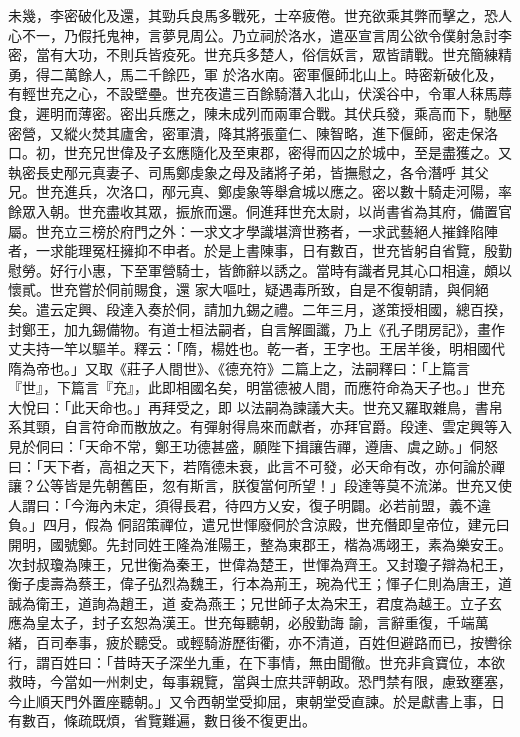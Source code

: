 \begin{pinyinscope}
 未幾，李密破化及還，其勁兵良馬多戰死，士卒疲倦。世充欲乘其弊而擊之，恐人心不一，乃假托鬼神，言夢見周公。乃立祠於洛水，遣巫宣言周公欲令僕射急討李密，當有大功，不則兵皆疫死。世充兵多楚人，俗信妖言，眾皆請戰。世充簡練精勇，得二萬餘人，馬二千餘匹，軍
 於洛水南。密軍偃師北山上。時密新破化及，有輕世充之心，不設壁壘。世充夜遣三百餘騎潛入北山，伏溪谷中，令軍人秣馬蓐食，遲明而薄密。密出兵應之，陳未成列而兩軍合戰。其伏兵發，乘高而下，馳壓密營，又縱火焚其廬舍，密軍潰，降其將張童仁、陳智略，進下偃師，密走保洛口。初，世充兄世偉及子玄應隨化及至東郡，密得而囚之於城中，至是盡獲之。又執密長史邴元真妻子、司馬鄭虔象之母及諸將子弟，皆撫慰之，各令潛呼
 其父兄。世充進兵，次洛口，邴元真、鄭虔象等舉倉城以應之。密以數十騎走河陽，率餘眾入朝。世充盡收其眾，振旅而還。侗進拜世充太尉，以尚書省為其府，備置官屬。世充立三榜於府門之外：一求文才學識堪濟世務者，一求武藝絕人摧鋒陷陣者，一求能理冤枉擁抑不申者。於是上書陳事，日有數百，世充皆躬自省覽，殷勤慰勞。好行小惠，下至軍營騎士，皆飾辭以誘之。當時有識者見其心口相違，頗以懷貳。世充嘗於侗前賜食，還
 家大嘔吐，疑遇毒所致，自是不復朝請，與侗絕矣。遣云定興、段達入奏於侗，請加九錫之禮。二年三月，遂策授相國，總百揆，封鄭王，加九錫備物。有道士桓法嗣者，自言解圖讖，乃上《孔子閉房記》，畫作丈夫持一竿以驅羊。釋云：「隋，楊姓也。乾一者，王字也。王居羊後，明相國代隋為帝也。」又取《莊子人間世》、《德充符》二篇上之，法嗣釋曰：「上篇言『世』，下篇言『充』，此即相國名矣，明當德被人間，而應符命為天子也。」世充大悅曰：「此天命也。」再拜受之，即
 以法嗣為諫議大夫。世充又羅取雜鳥，書帛系其頸，自言符命而散放之。有彈射得鳥來而獻者，亦拜官爵。段達、雲定興等入見於侗曰：「天命不常，鄭王功德甚盛，願陛下揖讓告禪，遵唐、虞之跡。」侗怒曰：「天下者，高祖之天下，若隋德未衰，此言不可發，必天命有改，亦何論於禪讓？公等皆是先朝舊臣，忽有斯言，朕復當何所望！」段達等莫不流涕。世充又使人謂曰：「今海內未定，須得長君，待四方乂安，復子明闢。必若前盟，義不違負。」四月，假為
 侗詔策禪位，遣兄世惲廢侗於含涼殿，世充僭即皇帝位，建元曰開明，國號鄭。先封同姓王隆為淮陽王，整為東郡王，楷為馮翊王，素為樂安王。次封叔瓊為陳王，兄世衡為秦王，世偉為楚王，世惲為齊王。又封瓊子辯為杞王，衡子虔壽為蔡王，偉子弘烈為魏王，行本為荊王，琬為代王；惲子仁則為唐王，道誠為衛王，道詢為趙王，道夌為燕王；兄世師子太為宋王，君度為越王。立子玄應為皇太子，封子玄恕為漢王。世充每聽朝，必殷勤誨
 諭，言辭重復，千端萬緒，百司奉事，疲於聽受。或輕騎游歷街衢，亦不清道，百姓但避路而已，按轡徐行，謂百姓曰：「昔時天子深坐九重，在下事情，無由聞徹。世充非貪寶位，本欲救時，今當如一州刺史，每事親覽，當與士庶共評朝政。恐門禁有限，慮致壅塞，今止順天門外置座聽朝。」又令西朝堂受抑屈，東朝堂受直諫。於是獻書上事，日有數百，條疏既煩，省覽難遍，數日後不復更出。




\end{pinyinscope}
